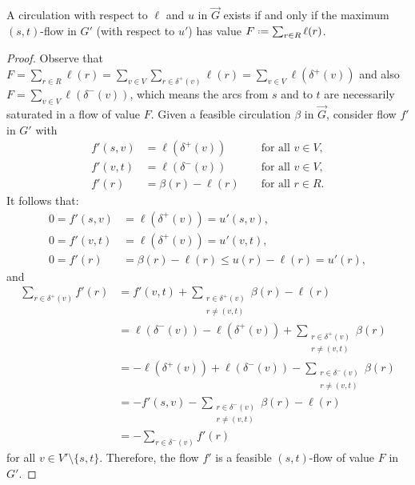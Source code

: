 \begin{lemma}
	\label{lemma:circulationflow}
	A circulation with respect to $\ell$ and $u$ in $\overrightarrow{G}$ exists if and only if the maximum $(s, t)$-flow in $G'$ (with respect to $u'$) has value $F \defeq \sum_{r \in R} \ell(r)$.
\end{lemma}
\begin{proof}
	Observe that $F = \sum_{r \in R} \ell(r) = \sum_{v \in V} \sum_{r \in \delta^+(v)} \ell(r) = \sum_{v \in V} \ell(\delta^+(v))$ and also $F = \sum_{v \in V} \ell(\delta^-(v))$, which means the arcs from $s$ and to $t$ are necessarily saturated in a flow of value $F$. Given a feasible circulation $\beta$ in $\overrightarrow{G}$, consider flow $f'$ in $G'$ with
	\begin{align*}
		f'(s,v) &= \ell(\delta^+(v)) && \text{ for all } v \in V,\\
		f'(v,t) &= \ell(\delta^-(v)) && \text{ for all } v \in V,\\
		f'(r) &= \beta(r) - \ell(r) && \text{ for all } r \in R.
	\end{align*}
	It follows that:
	\begin{align*}
		0 = f'(s,v) &= \ell(\delta^+(v)) = u'(s,v),\\
		0 = f'(v,t) &= \ell(\delta^+(v)) = u'(v,t),\\
		0 = f'(r) &= \beta(r) - \ell(r) \leq u(r) - \ell(r) = u'(r),
	\end{align*}
	and
	\begin{align*}
		\sum_{r \in \delta^+(v)} f'(r) &= f'(v,t) + \sum_{\substack{r \in \delta^+(v)\\ r \neq (v,t)}} \beta(r) - \ell(r)\\
		&= \ell(\delta^-(v)) - \ell(\delta^+(v)) + \sum_{\substack{r \in \delta^+(v)\\ r \neq (v,t)}} \beta(r)\\
		&= - \ell(\delta^+(v)) + \ell(\delta^-(v)) - \sum_{\substack{r \in \delta^-(v)\\ r \neq (v,t)}} \beta(r)\\
		&= - f'(s,v) - \sum_{\substack{r \in \delta^-(v)\\ r \neq (v,t)}} \beta(r) - \ell(r)\\
		&= - \sum_{r \in \delta^-(v)} f'(r)
	\end{align*}
	for all $v \in V' \setminus \{s,t\}$. Therefore, the flow $f'$ is a feasible $(s, t)$-flow of value $F$ in $G'$.\medskip
	

\end{proof}
